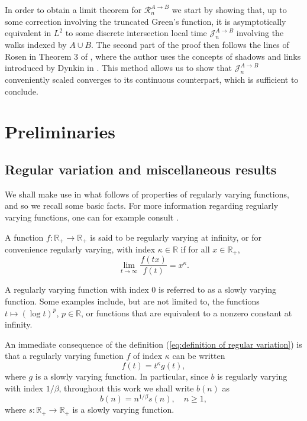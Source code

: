 \documentclass[10pt,a4paper]{amsart}
\newcommand{\RR}{\mathbb R}
\newcommand{\R}{\mathcal R}
\newcommand{\J}{\mathcal J}
\newcommand{\1}{\mathds{1}}
\numberwithin{equation}{section}
\begin{document}
In order to obtain a limit theorem for $\R_n^{A\rightarrow B}$ we start by showing that, up to some correction involving the truncated Green's function, it is asymptotically equivalent in $L^2$ to some discrete intersection local time $\J_n^{A\rightarrow B}$ involving the walks indexed by $A\cup B$. The second part of the proof then follows the lines of Rosen in Theorem $3$ of \cite{RosenRandomWalks&IntersectionLocalTimes1990}, where the author uses the concepts of shadows and links introduced by Dynkin in \cite{DynkinSelf-IntersectionGauge1988}. This method allows us to show that $\J_n^{A\rightarrow B}$ conveniently scaled converges to its continuous counterpart, which is sufficient to conclude.

\section{Preliminaries}
\label{section:Preliminary Results}

\subsection{Regular variation and miscellaneous results}

We shall make use in what follows of properties of regularly varying functions, and so we recall some basic facts. For more information regarding regularly varying functions, one can for example consult \cite{BinghamGoldieTeugelsRegularVariation1987}.

A function $f:\RR_+\rightarrow\RR_+$ is said to be regularly varying at infinity, or for convenience regularly varying, with index $\kappa\in\RR$ if for all $x\in\RR_+$,
\begin{equation}
\label{eq:definition of regular variation}
    \lim_{t\rightarrow\infty}\frac{f(tx)}{f(t)}=x^\kappa.
\end{equation} 

A regularly varying function with index $0$ is referred to as a slowly varying function. Some examples include, but are not limited to, the functions $t\mapsto(\log t)^p$, $p\in\RR$, or functions that are equivalent to a nonzero constant at infinity.

An immediate consequence of the definition (\ref{eq:definition of regular variation}) is that a regularly varying function $f$ of index $\kappa$ can be written
\begin{equation*}
    f(t)=t^\kappa g(t),
\end{equation*}
where $g$ is a slowly varying function. In particular, since $b$ is regularly varying with index $1/\beta$, throughout this work we shall write $b(n)$ as
\begin{equation*}
    b(n)=n^{1/\beta}s(n), \quad n\ge1,
\end{equation*}
where $s:\RR_+\rightarrow\RR_+$ is a slowly varying function.
\end{document}
